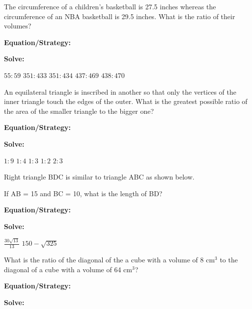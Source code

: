 \vfill
\newpage
\begin{multicols*}{2}
\begin{outline}[enumerate]
\medium

\1 The circumference of a children's basketball is 27.5 inches whereas the circumference of an NBA basketball is 29.5 inches. What is the ratio of their volumes?

\bigskip
\textbf{Equation/Strategy:} \hrulefill

\bigskip
\textbf{Solve:}

\vfill
\2 $55:59$
\2 $351:433$
\2 $351:434$
\2 $437:469$
\2 $438:470$

\midline

\1 An equilateral triangle is inscribed in another so that only the vertices of the inner triangle touch the edges of the outer. What is the greatest possible ratio of the area of the smaller triangle to the bigger one?

\bigskip
\textbf{Equation/Strategy:} \hrulefill

\bigskip
\textbf{Solve:}

\vfill
\2 $1:9$
\2 $1:4$
\2 $1:3$
\2 $1:2$
\2 $2:3$

\columnbreak
\advanced

\1 Right triangle BDC is similar to triangle ABC as shown below.

\begin{center}
\end{center}

If AB = 15 and BC = 10, what is the length of BD?

\bigskip
\textbf{Equation/Strategy:} \hrulefill

\bigskip
\textbf{Solve:}

\vfill
{}
\2 $\frac{30\sqrt{13}}{13}$
\2 $150-\sqrt{325}$

\midline

\1 What is the ratio of the diagonal of the a cube with a volume of 8 cm$^3$ to the diagonal of a cube with a volume of 64 cm$^3$?

\bigskip
\textbf{Equation/Strategy:}

\bigskip
\textbf{Solve:}

\vfill
\2 
\2 
\2 
\2 
\2 
\end{outline}
\end{multicols*}